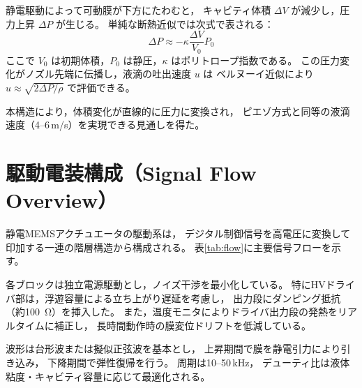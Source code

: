 \documentclass[conference]{IEEEtran}
\begin{document}
静電駆動によって可動膜が下方にたわむと，
キャビティ体積 $\Delta V$ が減少し，圧力上昇 $\Delta P$ が生じる。
単純な断熱近似では次式で表される：
\[
\Delta P \approx -\kappa \frac{\Delta V}{V_0} P_0
\]
ここで $V_0$ は初期体積，$P_0$ は静圧，$\kappa$ はポリトロープ指数である。
この圧力変化がノズル先端に伝播し，液滴の吐出速度 $u$ は
ベルヌーイ近似により $u \approx \sqrt{2\Delta P / \rho}$ で評価できる。

本構造により，体積変化が直線的に圧力に変換され，
ピエゾ方式と同等の液滴速度（4–6\,m/s）を実現できる見通しを得た。

\section{駆動電装構成（Signal Flow Overview）}
静電MEMSアクチュエータの駆動系は，
デジタル制御信号を高電圧に変換して印加する一連の階層構造から構成される。
表\ref{tab:flow}に主要信号フローを示す。

\begin{table}[t]
\centering
\caption{静電MEMSアクチュエータ駆動信号フロー}
\label{tab:flow}
\end{table}

各ブロックは独立電源駆動とし，ノイズ干渉を最小化している。
特にHVドライバ部は，浮遊容量による立ち上がり遅延を考慮し，
出力段にダンピング抵抗（約\SI{100}{\ohm}）を挿入した。
また，温度モニタによりドライバ出力段の発熱をリアルタイムに補正し，
長時間動作時の膜変位ドリフトを低減している。

波形は台形波または擬似正弦波を基本とし，
上昇期間で膜を静電引力により引き込み，
下降期間で弾性復帰を行う。
周期は10--50\,kHz，
デューティ比は液体粘度・キャビティ容量に応じて最適化される。
\end{document}
